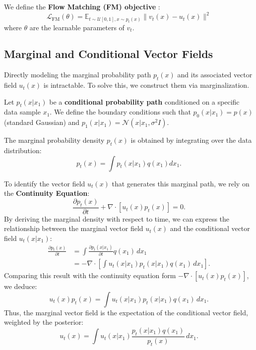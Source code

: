 \documentclass{article}
\begin{document}
We define the \textbf{Flow Matching (FM) objective} : 
\begin{equation}
    \mathcal{L}_{\text{FM}}(\theta) = \mathbb{E}_{t \sim \mathcal{U}[0,1],x\sim p_t(x)}\| v_t(x)-u_t(x) \|^2
\end{equation}
where $\theta$ are the learnable parameters of $v_t$.

\subsection{Marginal and Conditional Vector Fields}

Directly modeling the marginal probability path $p_t(x)$ and its associated vector field $u_t(x)$ is intractable. To solve this, we construct them via marginalization.

Let $p_t(x|x_1)$ be a \textbf{conditional probability path} conditioned on a specific data sample $x_1$. We define the boundary conditions such that $p_0(x|x_1) = p(x)$ (standard Gaussian) and $p_1(x|x_1) = \mathcal{N}(x | x_1, \sigma^2I)$.

The marginal probability density $p_t(x)$ is obtained by integrating over the data distribution:
\begin{equation}
    p_t(x) = \int p_t(x|x_1) q(x_1) dx_1.
\end{equation}

To identify the vector field $u_t(x)$ that generates this marginal path, we rely on the \textbf{Continuity Equation}:
\begin{equation}
    \frac{\partial p_t(x)}{\partial t} + \nabla \cdot \left[ u_t(x) p_t(x) \right] = 0.
\end{equation}
By deriving the marginal density with respect to time, we can express the relationship between the marginal vector field $u_t(x)$ and the conditional vector field $u_t(x|x_1)$:
\begin{align}
    \frac{\partial p_t(x)}{\partial t} &= \int \frac{\partial p_t(x|x_1)}{\partial t} q(x_1) \, dx_1 \\
    &= -\nabla \cdot \left[ \int u_t(x|x_1) p_t(x|x_1) q(x_1) \, dx_1 \right].
\end{align}
Comparing this result with the continuity equation form $-\nabla \cdot [u_t(x)p_t(x)]$, we deduce:
\begin{equation}
    u_t(x) p_t(x) = \int u_t(x|x_1) p_t(x|x_1) q(x_1) \, dx_1.
\end{equation}
Thus, the marginal vector field is the expectation of the conditional vector field, weighted by the posterior:
\begin{equation}
    u_t(x) = \int u_t(x|x_1) \frac{p_t(x|x_1) q(x_1)}{p_t(x)} \, dx_1.
    \label{eq:marginal_vf}
\end{equation}
\end{document}
